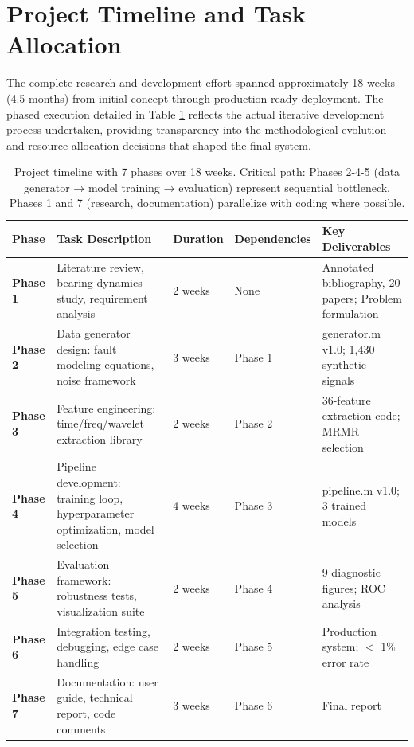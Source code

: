 \documentclass[11pt,a4paper]{article}
\begin{document}
\section{Project Timeline and Task Allocation}

The complete research and development effort spanned approximately 18 weeks (4.5 months) from initial concept through production-ready deployment. The phased execution detailed in Table \ref{tab:timeline} reflects the actual iterative development process undertaken, providing transparency into the methodological evolution and resource allocation decisions that shaped the final system.

\begin{table}[h]
\centering
\small
\begin{tabular}{@{}p{1.5cm}p{4cm}p{2cm}p{2.5cm}p{3.5cm}@{}}
\toprule
\textbf{Phase} & \textbf{Task Description} & \textbf{Duration} & \textbf{Dependencies} & \textbf{Key Deliverables} \\
\midrule
\textbf{Phase 1} & Literature review, bearing dynamics study, requirement analysis & 2 weeks & None & Annotated bibliography, 20 papers; Problem formulation \\
\midrule
\textbf{Phase 2} & Data generator design: fault modeling equations, noise framework & 3 weeks & Phase 1 & generator.m v1.0; 1,430 synthetic signals \\
\midrule
\textbf{Phase 3} & Feature engineering: time/freq/wavelet extraction library & 2 weeks & Phase 2 & 36-feature extraction code; MRMR selection \\
\midrule
\textbf{Phase 4} & Pipeline development: training loop, hyperparameter optimization, model selection & 4 weeks & Phase 3 & pipeline.m v1.0; 3 trained models \\
\midrule
\textbf{Phase 5} & Evaluation framework: robustness tests, visualization suite & 2 weeks & Phase 4 & 9 diagnostic figures; ROC analysis \\
\midrule
\textbf{Phase 6} & Integration testing, debugging, edge case handling & 2 weeks & Phase 5 & Production system;  $<$ 1\% error rate \\
\midrule
\textbf{Phase 7} & Documentation: user guide, technical report, code comments & 3 weeks & Phase 6 & Final report \\
\bottomrule
\end{tabular}
\caption{Project timeline with 7 phases over 18 weeks. Critical path: Phases 2-4-5 (data generator → model training → evaluation) represent sequential bottleneck. Phases 1 and 7 (research, documentation) parallelize with coding where possible.}
\label{tab:timeline}
\end{table}
\end{document}
